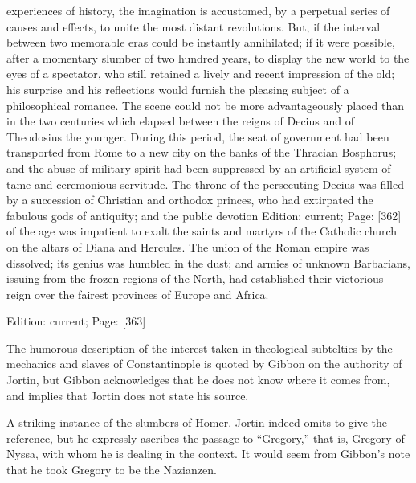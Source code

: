 experiences of history, the imagination is accustomed, by a perpetual series of causes and effects, to unite the most distant revolutions. But, if the interval between two memorable eras could be instantly annihilated; if it were possible, after a momentary slumber of two hundred years, to display the new world to the eyes of a spectator, who still retained a lively and recent impression of the old; his surprise and his reflections would furnish the pleasing subject of a philosophical romance. The scene could not be more advantageously placed than in the two centuries which elapsed between the reigns of Decius and of Theodosius the younger. During this period, the seat of government had been transported from Rome to a new city on the banks of the Thracian Bosphorus; and the abuse of military spirit had been suppressed by an artificial system of tame and ceremonious servitude. The throne of the persecuting Decius was filled by a succession of Christian and orthodox princes, who had extirpated the fabulous gods of antiquity; and the public devotion Edition: current; Page: [362] of the age was impatient to exalt the saints and martyrs of the Catholic church on the altars of Diana and Hercules. The union of the Roman empire was dissolved; its genius was humbled in the dust; and armies of unknown Barbarians, issuing from the frozen regions of the North, had established their victorious reign over the fairest provinces of Europe and Africa.

Edition: current; Page: [363]



The humorous description of the interest taken in theological subtelties by the mechanics and slaves of Constantinople is quoted by Gibbon on the authority of Jortin, but Gibbon acknowledges that he does not know where it comes from, and implies that Jortin does not state his source.

A striking instance of the slumbers of Homer. Jortin indeed omits to give the reference, but he expressly ascribes the passage to \texthebrew{“}Gregory,\texthebrew{}” that is, Gregory of Nyssa, with whom he is dealing in the context. It would seem from Gibbon\texthebrew{}’s note that he took Gregory to be the Nazianzen.

